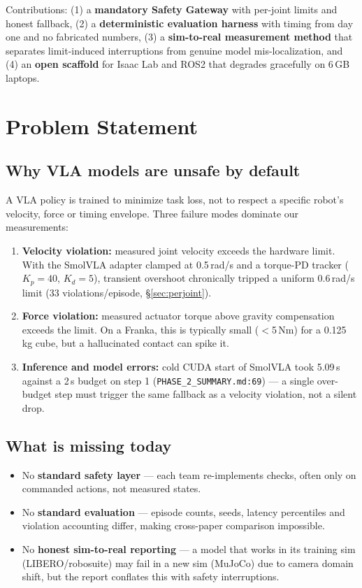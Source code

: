 \documentclass[11pt,a4paper]{article}
\begin{document}
Contributions: (1) a \textbf{mandatory Safety Gateway} with per-joint limits and honest fallback, (2) a \textbf{deterministic evaluation harness} with timing from day one and no fabricated numbers, (3) a \textbf{sim-to-real measurement method} that separates limit-induced interruptions from genuine model mis-localization, and (4) an \textbf{open scaffold} for Isaac Lab and ROS2 that degrades gracefully on 6\,GB laptops.

\section{Problem Statement}

\subsection{Why VLA models are unsafe by default}
A VLA policy is trained to minimize task loss, not to respect a specific robot's velocity, force or timing envelope. Three failure modes dominate our measurements:

\begin{enumerate}[leftmargin=18pt]
\item \textbf{Velocity violation:} measured joint velocity exceeds the hardware limit. With the SmolVLA adapter clamped at 0.5\,rad/s and a torque-PD tracker ($K_p=40$, $K_d=5$), transient overshoot chronically tripped a uniform 0.6\,rad/s limit (33 violations/episode, \S\ref{sec:perjoint}).
\item \textbf{Force violation:} measured actuator torque above gravity compensation exceeds the limit. On a Franka, this is typically small ($<$5\,Nm) for a 0.125\,kg cube, but a hallucinated contact can spike it.
\item \textbf{Inference and model errors:} cold CUDA start of SmolVLA took 5.09\,s against a 2\,s budget on step 1 (\texttt{PHASE\_2\_SUMMARY.md:69}) — a single over-budget step must trigger the same fallback as a velocity violation, not a silent drop.
\end{enumerate}

\subsection{What is missing today}
\begin{itemize}
\item No \textbf{standard safety layer} — each team re-implements checks, often only on commanded actions, not measured states.
\item No \textbf{standard evaluation} — episode counts, seeds, latency percentiles and violation accounting differ, making cross-paper comparison impossible.
\item No \textbf{honest sim-to-real reporting} — a model that works in its training sim (LIBERO/robosuite) may fail in a new sim (MuJoCo) due to camera domain shift, but the report conflates this with safety interruptions.
\end{itemize}
\end{document}
